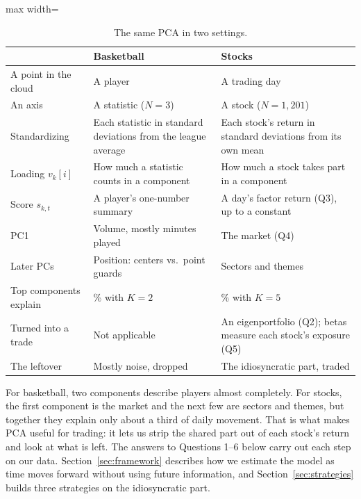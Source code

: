 \documentclass[12pt,letterpaper]{article}
\begin{document}
\begin{table}[!htbp]
\centering
\caption{The same PCA in two settings.}
\label{tab:primer-map}
\small
\begin{adjustbox}{max width=\linewidth}
\begin{tabular}{>{\raggedright\arraybackslash}p{3.4cm} >{\raggedright\arraybackslash}p{5.2cm} >{\raggedright\arraybackslash}p{5.6cm}}
\toprule
& Basketball & Stocks \\
\midrule
A point in the cloud & A player & A trading day \\
An axis & A statistic ($N=3$) & A stock ($N=1{,}201$) \\
Standardizing & Each statistic in standard deviations from the league average & Each stock's return in standard deviations from its own mean \\
Loading $v_k[i]$ & How much a statistic counts in a component & How much a stock takes part in a component \\
Score $s_{k,t}$ & A player's one-number summary & A day's factor return (Q3), up to a constant \\
PC1 & Volume, mostly minutes played & The market (Q4) \\
Later PCs & Position: centers vs.\ point guards & Sectors and themes \\
Top components explain & 93\% with $K=2$ & 35\% with $K=5$ \\
Turned into a trade & Not applicable & An eigenportfolio (Q2); betas measure each stock's exposure (Q5) \\
The leftover & Mostly noise, dropped & The idiosyncratic part, traded \\
\bottomrule
\end{tabular}
\end{adjustbox}
\end{table}

For basketball, two components describe players almost completely. For
stocks, the first component is the market and the next few are sectors
and themes, but together they explain only about a third of daily
movement. That is what makes PCA useful for trading: it lets us strip the
shared part out of each stock's return and look at what is left. The
answers to Questions 1--6 below carry out each step on our data.
Section~\ref{sec:framework} describes how we estimate the model as time moves forward
without using future information, and Section~\ref{sec:strategies} builds three strategies
on the idiosyncratic part.
\end{document}

